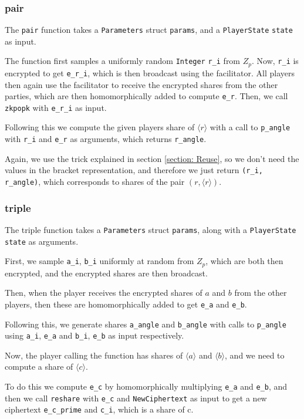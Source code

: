 \documentclass[../main.tex]{subfiles}
\begin{document}
\subsubsection{pair}
The \lstinline{pair} function takes a \lstinline{Parameters} struct \lstinline{params}, and a \lstinline{PlayerState} \lstinline{state} as input.

The function first samples a uniformly random \lstinline{Integer} \lstinline{r_i} from $Z_p$. Now, \lstinline{r_i} is encrypted to get \lstinline{e_r_i}, which is then broadcast using the facilitator. All players then again use the facilitator to receive the encrypted shares from the other parties, which are then homomorphically added to compute \lstinline{e_r}. Then, we call \lstinline{zkpopk} with \lstinline{e_r_i} as input.

Following this we compute the given players share of $\langle r \rangle$ with a call to \lstinline{p_angle} with \lstinline{r_i} and \lstinline{e_r} as arguments, which returns \lstinline{r_angle}.

Again, we use the trick explained in section \ref{section: Reuse}, so we don't need the values in the bracket representation, and therefore we just return \lstinline{(r_i, r_angle)}, which corresponds to shares of the pair $(r, \langle r \rangle)$.

\subsubsection{triple}
The triple function takes a \lstinline{Parameters} struct \lstinline{params}, along with a \lstinline{PlayerState} \lstinline{state} as arguments.

First, we sample \lstinline{a_i}, \lstinline{b_i} uniformly at random from $Z_p$, which are both then encrypted, and the encrypted shares are then broadcast.

Then, when the player receives the encrypted shares of $a$ and $b$ from the other players, then these are homomorphically added to get \lstinline{e_a} and \lstinline{e_b}.

Following this, we generate shares \lstinline{a_angle} and \lstinline{b_angle} with calls to \lstinline{p_angle} using \lstinline{a_i}, \lstinline{e_a} and \lstinline{b_i}, \lstinline{e_b} as input respectively.

Now, the player calling the function has shares of $\langle a \rangle$ and $\langle b \rangle$, and we need to compute a share of $\langle c \rangle$.

To do this we compute \lstinline{e_c} by homomorphically multiplying \lstinline{e_a} and \lstinline{e_b}, and then we call \lstinline{reshare} with \lstinline{e_c} and \lstinline{NewCiphertext} as input to get a new ciphertext \lstinline{e_c_prime} and \lstinline{c_i}, which is a share of c. 
\end{document}

